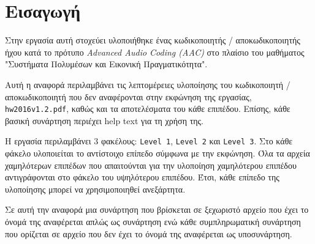\section{Εισαγωγή}
Στην εργασία αυτή στοχεύει υλοποιήθηκε ένας κωδικοποιητής / αποκωδικοποιητής ήχου κατά το πρότυπο \textit{Advanced Audio Coding (AAC)} στο πλαίσιο του μαθήματος "Συστήματα Πολυμέσων και Εικονική Πραγματικότητα".

\sloppy Αυτή η αναφορά περιλαμβάνει τις λεπτομέρειες υλοποίησης του κωδικοποιητή / αποκωδικοποιητή που δεν αναφέρονται στην εκφώνηση της εργασίας, \texttt{hw2016v1.2.pdf}, καθώς και τα αποτελέσματα του κάθε επιπέδου.
Επίσης, κάθε βασική συνάρτηση περιέχει help text για τη χρήση της.

Η εργασία περιλαμβάνει 3 φακέλους: \texttt{Level 1}, \texttt{Level 2} και \texttt{Level 3}.
Στο κάθε φάκελο υλοποιείται το αντίστοιχο επίπεδο σύμφωνα με την εκφώνηση.
Όλα τα αρχεία χαμηλότερων επιπέδων που απαιτούνται για την υλοποίηση χαμηλότερου επιπέδου αντιγράφονται στο φάκελο του υψηλότερου επιπέδου.
Έτσι, κάθε επίπεδο της υλοποίησης μπορεί να χρησιμοποιηθεί ανεξάρτητα.

Σε αυτή την αναφορά μια συνάρτηση που βρίσκεται σε ξεχωριστό αρχείο που έχει το όνομά της αναφέρεται απλώς ως συνάρτηση ενώ κάθε συμπληρωματική συνάρτηση που ορίζεται σε αρχείο που δεν έχει το όνομά της αναφέρεται ως υποσυνάρτηση.
